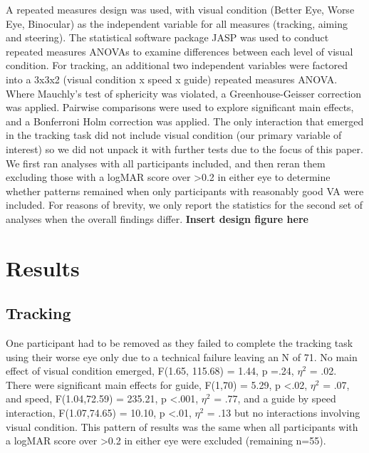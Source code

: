 \documentclass[
  english,
  man,floatsintext]{apa6}
\begin{document}
A repeated measures design was used, with visual condition (Better Eye, Worse Eye, Binocular) as the independent variable for all measures (tracking, aiming and steering).
The statistical software package JASP was used to conduct repeated measures ANOVAs to examine differences between each level of visual condition.
For tracking, an additional two independent variables were factored into a 3x3x2 (visual condition x speed x guide) repeated measures ANOVA.
Where Mauchly's test of sphericity was violated, a Greenhouse-Geisser correction was applied.
Pairwise comparisons were used to explore significant main effects, and a Bonferroni Holm correction was applied.
The only interaction that emerged in the tracking task did not include visual condition (our primary variable of interest) so we did not unpack it with further tests due to the focus of this paper.
We first ran analyses with all participants included, and then reran them excluding those with a logMAR score over \textgreater{}0.2 in either eye to determine whether patterns remained when only participants with reasonably good VA were included.
For reasons of brevity, we only report the statistics for the second set of analyses when the overall findings differ.
\textbf{Insert design figure here}

\hypertarget{results}{%
\section{Results}\label{results}}

\hypertarget{tracking}{%
\subsection{Tracking}\label{tracking}}

One participant had to be removed as they failed to complete the tracking task using their worse eye only due to a technical failure leaving an N of 71.
No main effect of visual condition emerged, F(1.65, 115.68) = 1.44, p =.24, \(\eta^2\) = .02.
There were significant main effects for guide, F(1,70) = 5.29, p \textless{}.02, \(\eta^2\) = .07, and speed, F(1.04,72.59) = 235.21, p \textless{}.001, \(\eta^2\) = .77, and a guide by speed interaction, F(1.07,74.65) = 10.10, p \textless{}.01, \(\eta^2\) = .13 but no interactions involving visual condition.
This pattern of results was the same when all participants with a logMAR score over \textgreater{}0.2 in either eye were excluded (remaining n=55).
\end{document}
